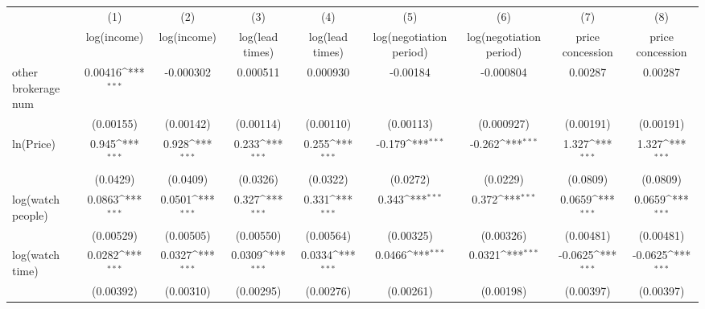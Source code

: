 {
\def\sym#1{\ifmmode^{#1}\else\(^{#1}\)\fi}
\begin{tabular}{l*{8}{c}}
\toprule
            &\multicolumn{1}{c}{(1)}&\multicolumn{1}{c}{(2)}&\multicolumn{1}{c}{(3)}&\multicolumn{1}{c}{(4)}&\multicolumn{1}{c}{(5)}&\multicolumn{1}{c}{(6)}&\multicolumn{1}{c}{(7)}&\multicolumn{1}{c}{(8)}\\
            &\multicolumn{1}{c}{log(income)}&\multicolumn{1}{c}{log(income)}&\multicolumn{1}{c}{log(lead times)}&\multicolumn{1}{c}{log(lead times)}&\multicolumn{1}{c}{log(negotiation period)}&\multicolumn{1}{c}{log(negotiation period)}&\multicolumn{1}{c}{price concession}&\multicolumn{1}{c}{price concession}\\
\midrule
other brokerage num  &     0.00416\sym{***}&   -0.000302         &    0.000511         &    0.000930         &    -0.00184         &   -0.000804         &     0.00287         &     0.00287         \\
            &   (0.00155)         &   (0.00142)         &   (0.00114)         &   (0.00110)         &   (0.00113)         &  (0.000927)         &   (0.00191)         &   (0.00191)         \\
\addlinespace
ln(Price)&       0.945\sym{***}&       0.928\sym{***}&       0.233\sym{***}&       0.255\sym{***}&      -0.179\sym{***}&      -0.262\sym{***}&       1.327\sym{***}&       1.327\sym{***}\\
            &    (0.0429)         &    (0.0409)         &    (0.0326)         &    (0.0322)         &    (0.0272)         &    (0.0229)         &    (0.0809)         &    (0.0809)         \\
\addlinespace
log(watch people)&      0.0863\sym{***}&      0.0501\sym{***}&       0.327\sym{***}&       0.331\sym{***}&       0.343\sym{***}&       0.372\sym{***}&      0.0659\sym{***}&      0.0659\sym{***}\\
            &   (0.00529)         &   (0.00505)         &   (0.00550)         &   (0.00564)         &   (0.00325)         &   (0.00326)         &   (0.00481)         &   (0.00481)         \\
\addlinespace
log(watch time)&      0.0282\sym{***}&      0.0327\sym{***}&      0.0309\sym{***}&      0.0334\sym{***}&      0.0466\sym{***}&      0.0321\sym{***}&     -0.0625\sym{***}&     -0.0625\sym{***}\\
            &   (0.00392)         &   (0.00310)         &   (0.00295)         &   (0.00276)         &   (0.00261)         &   (0.00198)         &   (0.00397)         &   (0.00397)         \\

\end{tabular}}
